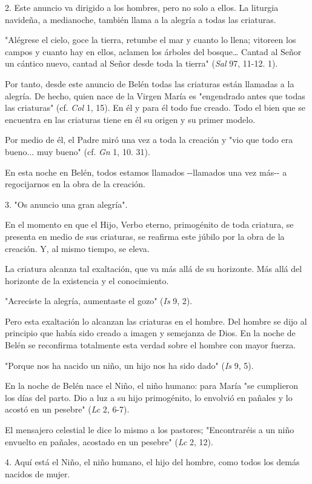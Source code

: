 \begin{body}
\begin{body}
2. Este anuncio va dirigido a los hombres, pero no solo a ellos. La liturgia navideña, a medianoche, también llama a la alegría a todas las criaturas.

"Alégrese el cielo, goce la tierra, retumbe el mar y cuanto lo llena; vitoreen los campos y cuanto hay en ellos, aclamen los árboles del bosque\ldots{} Cantad al Señor un cántico nuevo, cantad al Señor desde toda la tierra" (\emph{Sal} 97, 11-12. 1).

Por tanto, desde este anuncio de Belén todas las criaturas están llamadas a la alegría. De hecho, quien nace de la Virgen María es "engendrado antes que todas las criaturas" (cf. \emph{Col} 1, 15). En él y para él todo fue creado. Todo el bien que se encuentra en las criaturas tiene en él su origen y su primer modelo.

Por medio de él, el Padre miró una vez a toda la creación y "vio que todo era bueno... muy bueno" (cf. \emph{Gn} 1, 10. 31).

En esta noche en Belén, todos estamos llamados -\/-llamados una vez más-\/- a regocijarnos en la obra de la creación.

3. "Os anuncio una gran alegría".

En el momento en que el Hijo, Verbo eterno, primogénito de toda criatura, se presenta en medio de sus criaturas, se reafirma este júbilo por la obra de la creación. Y, al mismo tiempo, se eleva.

La criatura alcanza tal exaltación, que va más allá de su horizonte. Más allá del horizonte de la existencia y el conocimiento.

"Acreciste la alegría, aumentaste el gozo" (\emph{Is} 9, 2).

Pero esta exaltación lo alcanzan las criaturas en el hombre. Del hombre se dijo al principio que había sido creado a imagen y semejanza de Dios. En la noche de Belén se reconfirma totalmente esta verdad sobre el hombre con mayor fuerza.

"Porque nos ha nacido un niño, un hijo nos ha sido dado" (\emph{Is} 9, 5).

En la noche de Belén nace el Niño, el niño humano: para María "se cumplieron los días del parto. Dio a luz a su hijo primogénito, lo envolvió en pañales y lo acostó en un pesebre" (\emph{Lc} 2, 6-7).

El mensajero celestial le dice lo mismo a los pastores; "Encontraréis a un niño envuelto en pañales, acostado en un pesebre" (\emph{Lc} 2, 12).

4. Aquí está el Niño, el niño humano, el hijo del hombre, como todos los demás nacidos de mujer.


\end{body}
\end{body}
